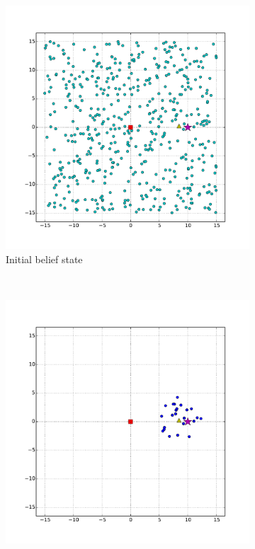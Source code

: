 
	\begin{figure}
	        \centering
	        \begin{subfigure}[b]{0.3\textwidth}
	                \includegraphics[width=\textwidth]{vantage_initial}
	                \caption{Initial belief state}
	                \label{fig:vantage_init}
	        \end{subfigure}%
	        ~ %
	        \begin{subfigure}[b]{0.3\textwidth}
	                \includegraphics[width=\textwidth]{vantage_first_obs}

\end{subfigure}
\end{figure}
